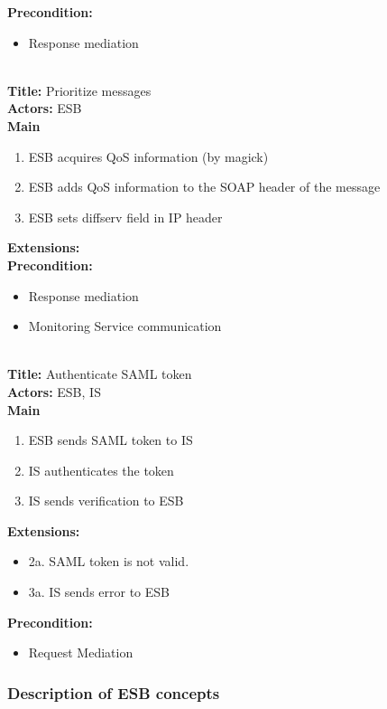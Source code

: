     \textbf{Precondition:}
    \begin{itemize}
        \item Response mediation
    \end{itemize}
    ~\\
    \textbf{Title:} Prioritize messages\\
    \textbf{Actors:} ESB\\
    \textbf{Main}
    \begin{enumerate}
        \item ESB acquires QoS information (by magick)
        \item ESB adds QoS information to the SOAP header of the message
        \item ESB sets diffserv field in IP header
    \end{enumerate}
    \textbf{Extensions:}\\
    \textbf{Precondition:}
    \begin{itemize}
        \item Response mediation
        \item Monitoring Service communication
    \end{itemize}
    ~\\
    \textbf{Title:} Authenticate SAML token\\
    \textbf{Actors:} ESB, IS\\
    \textbf{Main}
    \begin{enumerate}
        \item ESB sends SAML token to IS
        \item IS authenticates the token
        \item IS sends verification to ESB
    \end{enumerate}
    \textbf{Extensions:}
    \begin{itemize}
        \item[]	2a. SAML token is not valid.
        \item[]	3a. IS sends error to ESB
    \end{itemize}
    \textbf{Precondition:}
    \begin{itemize}
        \item Request Mediation
    \end{itemize}

    \subsubsection{Description of ESB concepts}\label{Description of ESB concepts} 

